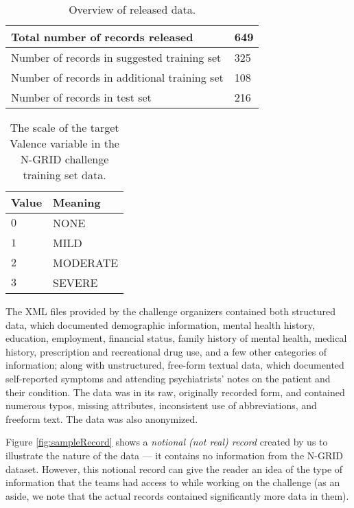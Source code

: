 \begin{table}
    \centering
    \begin{tabular}{|l|l|}
    \hline
    Total number of records released & 649  \\
    \hline
    Number of records in suggested training set    & 325  \\
    \hline
    Number of records in additional training set    & 108  \\
    \hline
    Number of records in test set   & 216 \\
    \hline
    \end{tabular}
    \caption{Overview of released data.}
    \label{tab:data1}
\end{table}


\begin{table}
\centering
    \begin{tabular}{|l|l|}
    \hline
    \textsf{Value} & \textsf{Meaning}\\
    \hline
    $0$  & \textsf{NONE}\\
    $1$  & \textsf{MILD}\\
    $2$  & \textsf{MODERATE}\\
    $3$  & \textsf{SEVERE}\\
    \hline
    \end{tabular}
    \caption{The scale of the target \textsf{Valence} variable in the N-GRID challenge training set data.}
    \label{tab:valence}
\end{table}

The  XML files provided by the challenge organizers contained both structured data, which documented
demographic information, mental health history, education, employment, financial status, family history of mental health, medical history, prescription and recreational drug use, and a few other categories of information; along with unstructured, free-form textual data, which documented self-reported symptoms and attending psychiatrists' notes on the patient and their condition. The data was in its raw, originally recorded form, and contained numerous typos, missing attributes, inconsistent use of abbreviations, and freeform text. The data was also anonymized.

Figure \ref{fig:sampleRecord} shows a \textit{notional (not real) record} created by us to illustrate the nature
of the data --- it contains no
information from the N-GRID dataset. However, this notional record
can give the reader an idea of the type of information that the teams had access to while working on the challenge
(as an aside, we note that the actual records contained significantly more data in them).

